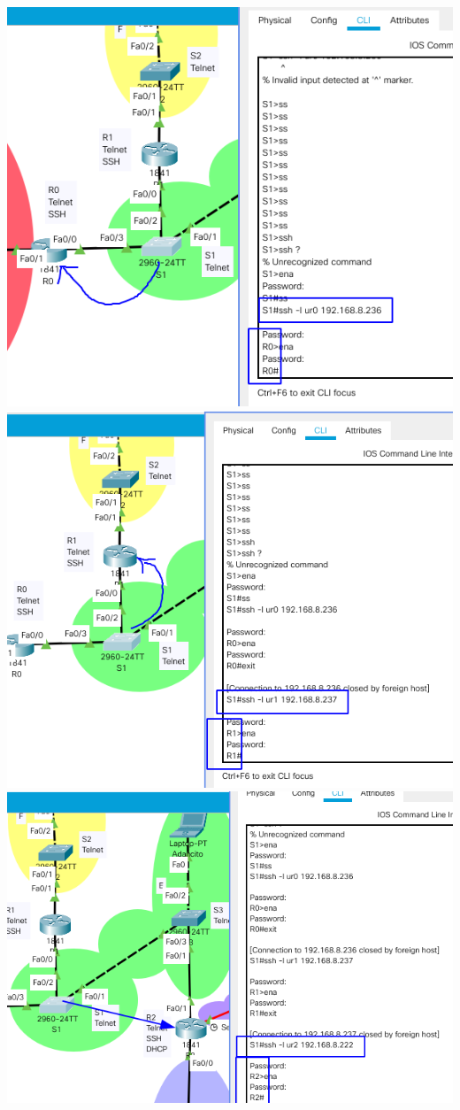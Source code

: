 \documentclass{article}
\begin{document}
\begin{enumerate}[label=\textbf{\arabic*.}]
  \includegraphics[width=0.8\linewidth]{ssh-s1-r0.png}\\[3mm]
  \includegraphics[width=0.8\linewidth]{ssh-s1-r1.png}\\[3mm]
  \includegraphics[width=0.8\linewidth]{ssh-s1-r2.png}\\[3mm]

\end{enumerate}
\end{document}
